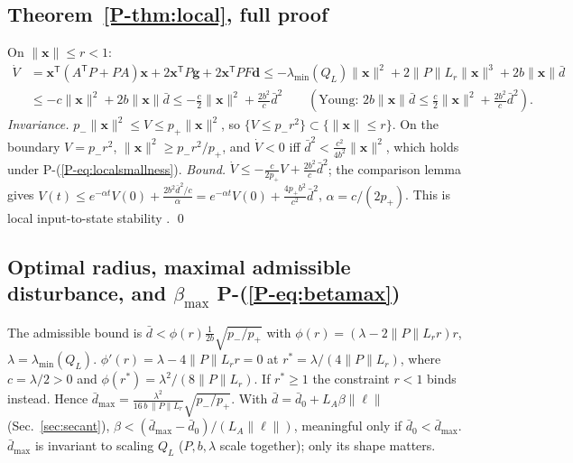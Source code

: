 \documentclass[11pt]{article}
\newcommand{\T}{^{\mathsf T}}
\newcommand{\PE}[1]{P-(\ref{P-#1})}          %
\newcommand{\PT}[1]{\ref{P-#1}}               %
\theoremstyle{remark}
\begin{document}
\subsection{Theorem~\PT{thm:local}, full proof}
On $\|\bm x\|\le r<1$:
\begin{align*}
\dot V&=\bm x\T(A\T P+PA)\bm x+2\bm x\T P\bm g+2\bm x\T PF\bm d
\le-\lambda_{\min}(Q_L)\|\bm x\|^2+2\|P\|L_r\|\bm x\|^3+2b\|\bm x\|\bar d\\
&\le-c\|\bm x\|^2+2b\|\bm x\|\bar d
\le-\tfrac c2\|\bm x\|^2+\tfrac{2b^2}{c}\bar d^2\qquad(\text{Young: }2b\|\bm x\|\bar d\le\tfrac c2\|\bm x\|^2+\tfrac{2b^2}c\bar d^2).
\end{align*}
\emph{Invariance.} $p_-\|\bm x\|^2\le V\le p_+\|\bm x\|^2$, so $\{V\le p_-r^2\}\subset\{\|\bm x\|\le r\}$. On the
boundary $V=p_-r^2$, $\|\bm x\|^2\ge p_-r^2/p_+$, and $\dot V<0$ iff
$\bar d^2<\frac{c^2}{4b^2}\|\bm x\|^2$, which holds under \PE{eq:localsmallness}. \emph{Bound.}
$\dot V\le-\frac c{2p_+}V+\frac{2b^2}c\bar d^2$; the comparison lemma \cite{khalil2002nonlinear} gives
$V(t)\le e^{-\alpha t}V(0)+\frac{2b^2\bar d^2/c}{\alpha}=e^{-\alpha t}V(0)+\frac{4p_+b^2}{c^2}\bar d^2$,
$\alpha=c/(2p_+)$. This is local input-to-state stability \cite{sontag1989iss}. \qed

\subsection{Optimal radius, maximal admissible disturbance, and $\beta_{\max}$ \PE{eq:betamax}}
The admissible bound is $\bar d<\phi(r)\frac{1}{2b}\sqrt{p_-/p_+}$ with $\phi(r)=(\lambda-2\|P\|L_rr)r$,
$\lambda=\lambda_{\min}(Q_L)$. $\phi'(r)=\lambda-4\|P\|L_rr=0$ at $r^*=\lambda/(4\|P\|L_r)$, where
$c=\lambda/2>0$ and $\phi(r^*)=\lambda^2/(8\|P\|L_r)$. If $r^*\ge1$ the constraint $r<1$ binds instead. Hence
$\bar d_{\max}=\frac{\lambda^2}{16\,b\,\|P\|L_r}\sqrt{p_-/p_+}$. With $\bar d=\bar d_0+L_A\beta\|\bm\ell\|$
(Sec.~\ref{sec:secant}), $\beta<(\bar d_{\max}-\bar d_0)/(L_A\|\bm\ell\|)$, meaningful only if $\bar d_0<\bar d_{\max}$.
$\bar d_{\max}$ is invariant to scaling $Q_L$ ($P,b,\lambda$ scale together); only its shape matters.
\end{document}
